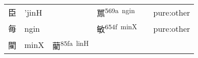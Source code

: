 \documentclass[14pt,a4paper]{scrartcl}
\begin{document}
\begin{longtable}[c]{@{}llllll@{}}
\begin{minipage}[t]{0.14\columnwidth}\raggedright\strut
臣
\strut\end{minipage} &
\begin{minipage}[t]{0.14\columnwidth}\raggedright\strut
'jinH
\strut\end{minipage} &
\begin{minipage}[t]{0.14\columnwidth}\raggedright\strut
\strut\end{minipage} &
\begin{minipage}[t]{0.14\columnwidth}\raggedright\strut
嚚\textsuperscript{569a~ngin}
\strut\end{minipage} &
\begin{minipage}[t]{0.14\columnwidth}\raggedright\strut
\strut\end{minipage} &
\begin{minipage}[t]{0.14\columnwidth}\raggedright\strut
pure:other
\strut\end{minipage}\tabularnewline
\begin{minipage}[t]{0.14\columnwidth}\raggedright\strut
毎
\strut\end{minipage} &
\begin{minipage}[t]{0.14\columnwidth}\raggedright\strut
ngin
\strut\end{minipage} &
\begin{minipage}[t]{0.14\columnwidth}\raggedright\strut
\strut\end{minipage} &
\begin{minipage}[t]{0.14\columnwidth}\raggedright\strut
敏\textsuperscript{654f~minX}
\strut\end{minipage} &
\begin{minipage}[t]{0.14\columnwidth}\raggedright\strut
\strut\end{minipage} &
\begin{minipage}[t]{0.14\columnwidth}\raggedright\strut
pure:other
\strut\end{minipage}\tabularnewline
\begin{minipage}[t]{0.14\columnwidth}\raggedright\strut
閵
\strut\end{minipage} &
\begin{minipage}[t]{0.14\columnwidth}\raggedright\strut
minX
\strut\end{minipage} &
\begin{minipage}[t]{0.14\columnwidth}\raggedright\strut
藺\textsuperscript{85fa~linH}
\strut\end{minipage} &
\begin{minipage}[t]{0.14\columnwidth}\raggedright\strut

\end{minipage}
\end{longtable}
\end{document}
